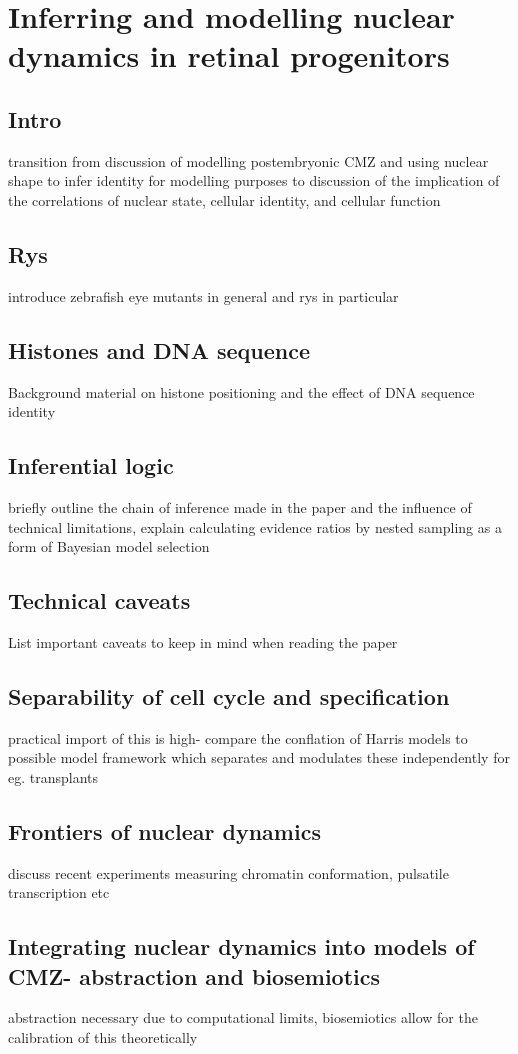 \chapter{Inferring and modelling nuclear dynamics in retinal progenitors}
\label{chap:rysintro}

\section{Intro}
transition from discussion of modelling postembryonic CMZ and using nuclear shape to infer identity for modelling purposes to discussion of the implication of the correlations of nuclear state, cellular identity, and cellular function

\section{Rys}
introduce zebrafish eye mutants in general and rys in particular

\section{Histones and DNA sequence}
Background material on histone positioning and the effect of DNA sequence identity

\section{Inferential logic}
briefly outline the chain of inference made in the paper and the influence of technical limitations, explain calculating evidence ratios by nested sampling as a form of Bayesian model selection
\section{Technical caveats}
List important caveats to keep in mind when reading the paper

\section{Separability of cell cycle and specification}
practical import of this is high- compare the conflation of Harris models to possible model framework which separates and modulates these independently for eg. transplants
\section{Frontiers of nuclear dynamics}
discuss recent experiments measuring chromatin conformation, pulsatile transcription etc
\section{Integrating nuclear dynamics into models of CMZ- abstraction and biosemiotics}
abstraction necessary due to computational limits, biosemiotics allow for the calibration of this theoretically


